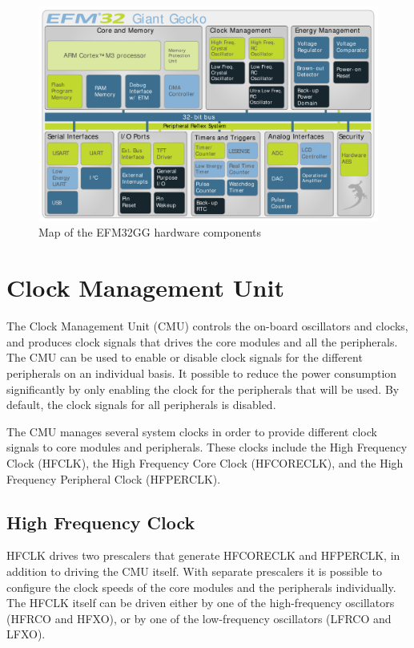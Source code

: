 \begin{figure}[H]
  \centering
  \includegraphics[width=\textwidth]{images/giant_gecko_map.png}
  \caption{Map of the EFM32GG hardware components}\label{fig:giant-gecko-map}
\end{figure}


\section{Clock Management Unit}\label{sec:cmu}
The Clock Management Unit (CMU) controls the on-board oscillators and clocks, and produces clock signals that drives the core modules and all the peripherals. The CMU can be used to enable or disable clock signals for the different peripherals on an individual basis. It possible to reduce the power consumption significantly by only enabling the clock for the peripherals that will be used. By default, the clock signals for all peripherals is disabled. 

The CMU manages several system clocks in order to provide different clock signals to core modules and peripherals. These clocks include the High Frequency Clock (HFCLK), the High Frequency Core Clock (HFCORECLK), and the High Frequency Peripheral Clock (HFPERCLK).\cite{efm32gg-rm}

\subsection{High Frequency Clock}
HFCLK drives two prescalers that generate HFCORECLK and HFPERCLK, in addition to driving the CMU itself. With separate prescalers it is possible to configure the clock speeds of the core modules and the peripherals individually. The HFCLK itself can be driven either by one of the high-frequency oscillators (HFRCO and HFXO), or by one of the low-frequency oscillators (LFRCO and LFXO). 

